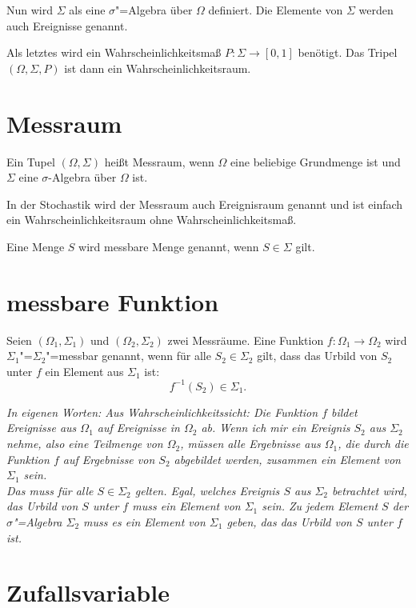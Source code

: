 \documentclass[paper=a4,10pt]{scrartcl}
\begin{document}
\noindent
Nun wird $\Sigma$ als eine $\sigma$"=Algebra über $\Omega$ definiert. Die Elemente von $\Sigma$ werden auch Ereignisse genannt. 

\noindent
Als letztes wird ein Wahrscheinlichkeitsmaß $P: \Sigma \rightarrow [0,1]$ benötigt. Das Tripel $(\Omega, \Sigma, P)$ ist dann ein Wahrscheinlichkeitsraum.
 

\section{Messraum}
Ein Tupel $(\Omega, \Sigma)$ heißt Messraum, wenn $\Omega$ eine beliebige Grundmenge ist und $\Sigma$ eine $\sigma$-Algebra über $\Omega$ ist.

\noindent
In der Stochastik wird der Messraum auch Ereignisraum genannt und ist einfach ein Wahrscheinlichkeitsraum ohne Wahrscheinlichkeitsmaß.

\noindent
Eine Menge $S$ wird messbare Menge genannt, wenn $S \in \Sigma$ gilt.

\section{messbare Funktion}
Seien $(\Omega_1, \Sigma_1)$ und $(\Omega_2, \Sigma_2)$ zwei Messräume. Eine Funktion $f: \Omega_1 \rightarrow \Omega_2$ wird $\Sigma_1$"=$\Sigma_2$"=messbar genannt, wenn für alle $S_2 \in \Sigma_2$ gilt, dass das Urbild von $S_2$ unter $f$ ein Element aus $\Sigma_1$ ist:
\begin{equation}
f^{-1}(S_2) \in \Sigma_1.
\end{equation}

\noindent
\textit{In eigenen Worten: Aus Wahrscheinlichkeitssicht: Die Funktion $f$ bildet Ereignisse aus $\Omega_1$ auf Ereignisse in $\Omega_2$ ab. Wenn ich mir ein Ereignis $S_2$ aus $\Sigma_2$ nehme, also eine Teilmenge von $\Omega_2$, müssen alle Ergebnisse aus $\Omega_1$, die durch die Funktion $f$ auf Ergebnisse von $S_2$ abgebildet werden, zusammen ein Element von $\Sigma_1$ sein. \\
Das muss für alle $S \in  \Sigma_2$ gelten. Egal, welches Ereignis $S$ aus $\Sigma_2$ betrachtet wird, das Urbild von $S$ unter $f$ muss ein Element von $\Sigma_1$ sein. Zu jedem Element $S$ der $\sigma$"=Algebra $\Sigma_2$ muss es ein Element von $\Sigma_1$ geben, das das Urbild von $S$ unter $f$ ist.}

\section{Zufallsvariable}
\end{document}
